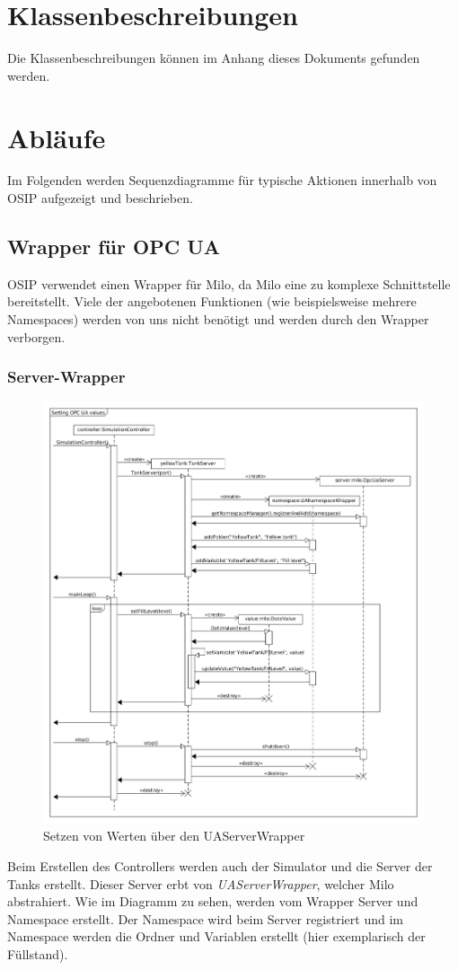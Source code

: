 \documentclass[parskip=full]{scrartcl}
\begin{document}
\section{Klassenbeschreibungen}
Die Klassenbeschreibungen können im Anhang dieses Dokuments gefunden werden.

\section{Abläufe}
Im Folgenden werden Sequenzdiagramme für typische Aktionen innerhalb von OSIP aufgezeigt und beschrieben.
\subsection{Wrapper für OPC UA}
OSIP verwendet einen Wrapper für Milo, da Milo eine zu komplexe Schnittstelle bereitstellt.
Viele der angebotenen Funktionen (wie beispielsweise mehrere Namespaces) werden von uns nicht benötigt
und werden durch den Wrapper verborgen.


\subsubsection{Server-Wrapper}
\begin{figure}[H]
  \centering
  \includegraphics[scale=0.38]{design/sequence-diagrams/sequence-set-server-value.png}
  \caption{Setzen von Werten über den UAServerWrapper}
\end{figure}
Beim Erstellen des Controllers werden auch der Simulator und die Server der Tanks erstellt.
Dieser Server erbt von \emph{UAServerWrapper}, welcher Milo abstrahiert. Wie im Diagramm zu sehen,
werden vom Wrapper Server und Namespace erstellt. Der Namespace wird beim Server registriert und
im Namespace werden die Ordner und Variablen erstellt (hier exemplarisch der Füllstand).
\end{document}
